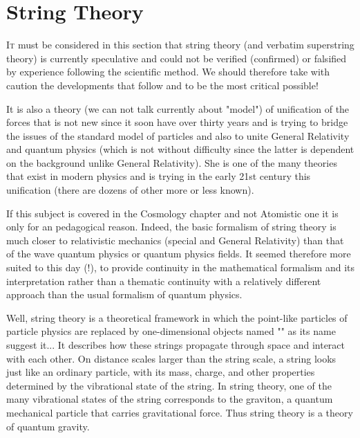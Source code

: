 	\newpage
	\thispagestyle{empty}
	\mbox{}
	\section{String Theory}\label{string theory}
	\lettrine[lines=4]{\color{BrickRed}I}t must be considered in this section that string theory (and verbatim superstring theory) is currently speculative and could not be verified (confirmed) or falsified by experience following the scientific method. We should therefore take with caution the developments that follow and to be the most critical possible!
	
	It is also a theory (we can not talk currently about "model") of unification of the forces that is not new since it soon have over thirty years and is trying to bridge the issues of the standard model of particles and also to unite General Relativity and quantum physics (which is not without difficulty since the latter is dependent on the background unlike General Relativity). She is one of the many theories that exist in modern physics and is trying in the early 21st century this unification (there are dozens of other more or less known).
	
	\begin{tcolorbox}[title=Remark,colframe=black,arc=10pt]
	If this subject is covered in the Cosmology chapter and not Atomistic one it is only for an pedagogical reason. Indeed, the basic formalism of string theory is much closer to relativistic mechanics (special and General Relativity) than that of the wave quantum physics or quantum physics fields. It seemed therefore more suited to this day (!), to provide continuity in the mathematical formalism and its interpretation rather than a thematic continuity with a relatively different approach than the usual formalism of quantum physics.
	\end{tcolorbox}
	Well, string theory is a theoretical framework in which the point-like particles of particle physics are replaced by one-dimensional objects named "" as its name suggest it... It describes how these strings propagate through space and interact with each other. On distance scales larger than the string scale, a string looks just like an ordinary particle, with its mass, charge, and other properties determined by the vibrational state of the string. In string theory, one of the many vibrational states of the string corresponds to the graviton, a quantum mechanical particle that carries gravitational force. Thus string theory is a theory of quantum gravity.

